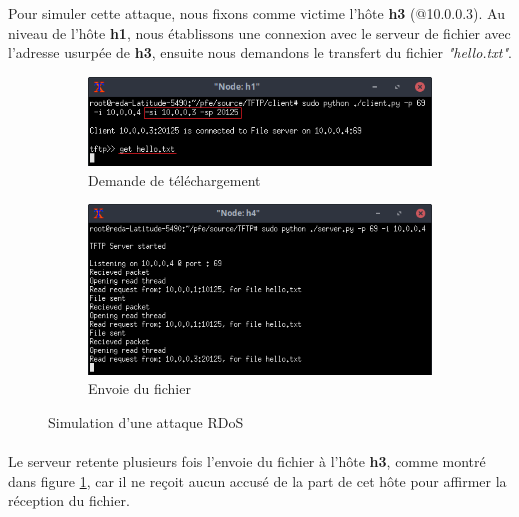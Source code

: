 \noindent Pour simuler cette attaque, nous fixons comme victime l'hôte \textbf{h3} (@10.0.0.3). Au niveau de l'hôte \textbf{h1}, nous établissons une connexion avec le serveur de fichier avec l'adresse usurpée de \textbf{h3}, ensuite nous demandons le transfert du fichier \textit{"hello.txt"}.\\
\begin{figure}[H]
\centering
\begin{subfigure}{13cm}
\centering
\includegraphics[width=\textwidth]{Figures/simulation/mininet/TFTP/client/attack}
\caption{Demande de téléchargement}
\end{subfigure}
\vskip 0.4cm
\begin{subfigure}{13cm}
\centering
\includegraphics[width=\textwidth]{Figures/simulation/mininet/TFTP/server/attack_request}
\caption{Envoie du fichier}
\label{fig:send}
\end{subfigure}
\vskip 0.3cm
\decoRule
\caption{Simulation d'une attaque RDoS}
\label{fig:rdos_simulation}
\end{figure}
\paragraph{}
Le serveur retente plusieurs fois l'envoie du fichier à l'hôte \textbf{h3}, comme montré dans figure \ref{fig:send}, car il ne reçoit aucun accusé de la part de cet hôte pour affirmer la réception du fichier.\\


